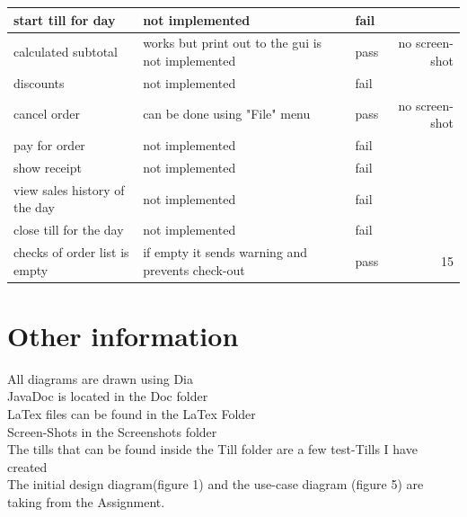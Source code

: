 \documentclass[11pt,a4paper]{article}
\begin{document}
\begin{flushleft}
\begin{longtable}{|p{2.5cm}|p{2.5cm}|p{2.5cm}|r|}
start till for day & not implemented  & fail & \multicolumn{1}{l|}{} \\ \hline
calculated subtotal & works but print out to the gui is not implemented & pass & no screen-shot \\ \hline
discounts & not implemented & fail & \multicolumn{1}{l|}{} \\ \hline
cancel order & can be done using "File" menu & pass & no screen-shot \\ \hline
pay for order & not implemented & fail & \multicolumn{1}{l|}{} \\ \hline
show receipt & not implemented & fail & \multicolumn{1}{l|}{} \\ \hline
view sales history of the day & not implemented & fail & \multicolumn{1}{l|}{} \\ \hline
close till for the day & not implemented & fail & \multicolumn{1}{l|}{} \\ \hline
checks of order list is empty & if empty it sends warning and prevents check-out & pass & 15 \\ \hline
\end{longtable}
\vspace{11pt}
\section{Other information}
All diagrams are drawn using Dia\\
JavaDoc is located in the Doc folder\\
LaTex files can be found in the LaTex Folder\\
Screen-Shots in the Screenshots folder\\
The tills that can be found inside the Till folder are a few test-Tills I have created\\
The initial design diagram(figure 1) and the use-case diagram (figure 5) are taking from the Assignment.

\newpage

\end{flushleft}
\end{document}
